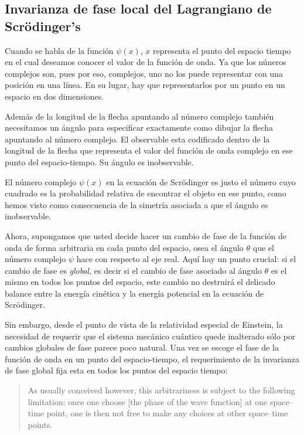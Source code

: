 \begin{subappendices}
\section{Invarianza de fase local del Lagrangiano de  Scrödinger's}

Cuando se habla de la función $\psi(x)$, $x$ representa el punto del espacio tiempo en el cual deseamos conocer el valor de la función de onda. 
Ya que los núneros complejos son, pues por eso, complejos, uno no los puede representar con una posición en una línea. En su lugar, hay que representarlos por un punto en un espacio en dos dimensiones.

Además de la longitud de la flecha apuntando al número complejo también necesitamos un ángulo para especificar exactamente como dibujar la flecha apuntando al número complejo. El observable esta codificado dentro de la longitud de la flecha que representa el valor del función de onda complejo en ese punto del espacio-tiempo. Su ángulo es inobservable.

El número complejo $\psi(x)$  en la ecuación de Scrödinger es justo el número cuyo cuadrado es la probabilidad relativa de encontrar el objeto en ese punto, como hemos visto como consecuencia de la simetría asociada a que el ángulo es inobservable.

Ahora, supongamos que usted decide hacer un cambio de fase de la función de onda de forma arbitraria en cada punto del espacio, osea el ángulo $\theta$ que el número complejo $\psi$ hace con respecto al eje real. Aquí hay un punto crucial: si el cambio de fase es \emph{global}, es decir si el cambio de fase asociado al ángulo $\theta$ es el mismo en todos los puntos del espacio, este cambio no destruirá el delicado balance entre la energía cinética y la energía potencial en la ecuación de Scrödinger.

Sin embargo, desde el punto de vista de la relatividad especial de Einstein, la necesidad de requerir que el sistema mecánico cuántico quede inalterado sólo por cambios globales de fase parece poco natural. Una vez se escoge el fase de la función de onda en un punto del espacio-tiempo, el requerimiento de la invarianza de fase global fija esta en todos los puntos del espacio tiempo: 

  \begin{quote}
\small
    As usually conceived however, this arbitrariness is subject to the following  limitation: once one choose [the phase of the wave function] at one space--time point, one is then not free to make any choices at other space--time points.


\end{quote}
\end{subappendices}
